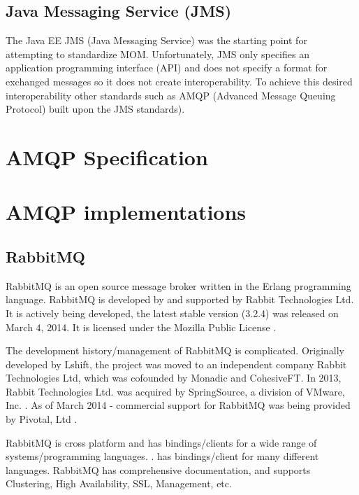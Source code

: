 \documentclass{thesis}
\begin{document}

\subsection{Java Messaging Service (JMS)}
The Java EE JMS (Java Messaging Service) was the starting point for attempting to standardize MOM. Unfortunately, JMS only specifies an application programming interface (API) and does not specify a format for exchanged messages so it does not create interoperability.   To achieve this desired interoperability other standards such as AMQP (Advanced Message Queuing Protocol) built upon the JMS standards). 



\section{AMQP Specification}


\section{AMQP implementations}


\subsection{RabbitMQ}
RabbitMQ is an open source message broker written in the Erlang programming language.   RabbitMQ is developed by and supported by Rabbit Technologies Ltd.  It is actively being developed, the latest stable version (3.2.4) was released on March 4, 2014.  It is licensed under the Mozilla Public License \cite{rabbitmq-wikipedia}.

The development history/management of RabbitMQ is complicated.  Originally developed by Lshift, the project was moved to an independent company Rabbit Technologies Ltd, which was cofounded by Monadic and CohesiveFT.  In 2013, Rabbit Technologies Ltd. was acquired by SpringSource, a division of VMware, Inc. .  As of March 2014 - commercial support for RabbitMQ was being provided by Pivotal, Ltd  .

RabbitMQ is cross platform and has bindings/clients for a wide range of systems/programming languages.  .  has bindings/client for many different languages.  RabbitMQ has comprehensive documentation, and supports Clustering, High Availability, SSL, Management, etc. 
\end{document}
